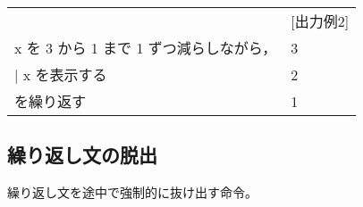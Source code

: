 \documentclass[11pt,a4j]{jarticle}
\begin{document}
\vspace{3mm}
\hspace*{10mm}
\begin{tabular}{l l}
\noindent [使用例2] & \hspace{1cm} [出力例2] \\
\hspace{1cm} \noindent x を 3 から 1 まで 1 ずつ減らしながら， & 
\hspace{2cm} 3 \\
\hspace{1cm}   \hspace{1zw} $|$ \hspace{1zw}  x を表示する & 
\hspace{2cm} 2 \\
\hspace{1cm} を繰り返す &
\hspace{2cm} 1 \\
\end{tabular}


\vspace{-4mm}
\subsection{繰り返し文の脱出}
\begin{quotation}
\end{quotation}

繰り返し文を途中で強制的に抜け出す命令。
\end{document}
